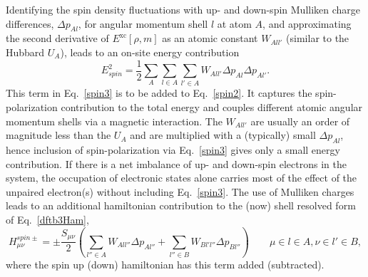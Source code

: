 \documentclass{revtex4-1}
\begin{document}
Identifying the spin density fluctuations with up- and down-spin Mulliken charge
differences, $\Delta p_{Al}$, for angular momentum shell $l$ at atom $A$, and
approximating the second derivative of $E^{\text{xc}}[\rho,m]$ as an atomic
constant $W_{All'}$ (similar to the Hubbard $U_A$), leads to an on-site energy
contribution
\begin{equation}
  E^2_{spin}=\frac{1}{2}\sum_{A}\sum_{l \in A} \sum_{l' \in A} W_{All'} \Delta
  p_{Al}\Delta p_{Al'}.\label{spin3}
\end{equation}
This term in Eq.~\eqref{spin3} is to be added to Eq.~\eqref{spin2}. It captures
the spin-polarization contribution to the total energy and couples different
atomic angular momentum shells via a magnetic interaction. The $W_{All'}$ are
usually an order of magnitude less than the $U_A$ and are multiplied with a
(typically) small $\Delta p_{Al}$, hence inclusion of spin-polarization via
Eq.~\eqref{spin3} gives only a small energy contribution. If there is a net
imbalance of up- and down-spin electrons in the system, the occupation of
electronic states alone carries most of the effect of the unpaired electron(s)
without including Eq.~\eqref{spin3}.  The use of Mulliken charges leads to an
additional hamiltonian contribution\cite{Koehler2005} to the (now) shell
resolved form of Eq.~\eqref{dftb3Ham},
\begin{equation}
  H^{spin\pm}_{\mu\nu} = \pm \frac{S_{\mu\nu}}{2} \left( \sum\limits_{l'' \in A}
  W_{All''}\Delta p_{Al''} + \sum\limits_{l'' \in B} W_{Bl'l''}\Delta
  p_{Bl''}\right)\qquad{\mu \in l \in A, \nu \in l' \in B,}\label{spin4}
\end{equation}
where the spin up (down) hamiltonian has this term added (subtracted).
\end{document}
